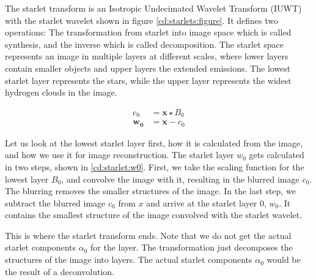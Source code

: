 The starlet transform is an Isotropic Undecimated Wavelet Transform (IUWT) with the starlet wavelet shown in figure \ref{cd:starlets:figure}. It defines two operations: The transformation from starlet into image space which is called synthesis, and the inverse which is called decomposition. The starlet space represents an image in multiple layers at different scales, where lower layers contain smaller objects and upper layers the extended emissions. The lowest starlet layer represents the stars, while the upper layer represents the widest hydrogen clouds in the image.

\begin{equation}\label{cd:starlet:w0}
\begin{aligned}
	c_0 &= \bm{x} \star B_0 \\
	\bm{w_0} &= \bm{x} - c_0
\end{aligned}
\end{equation}

Let us look at the lowest starlet layer first, how it is calculated from the image, and how we use it for image reconstruction. The starlet layer $w_0$ gets calculated in two steps, shown in \eqref{cd:starlet:w0}. First, we take the scaling function for the lowest layer $B_0$, and convolve the image with it, resulting in the blurred image $c_0$. The blurring removes the smaller structures of the image. In the last step, we subtract the blurred image $c_0$ from $x$ and arrive at the starlet layer 0, $w_0$. It contains the smallest structure of the image convolved with the starlet wavelet. 

This is where the starlet transform ends. Note that we do not get the actual starlet components $\alpha_0$ for the layer. The transformation just decomposes the structures of the image into layers. The actual starlet components $\alpha_0$ would be the result of a deconvolution. 

